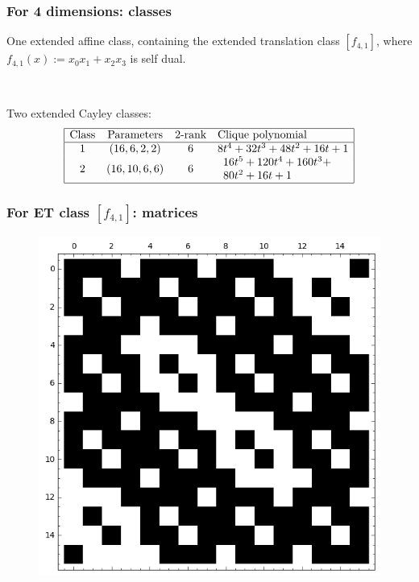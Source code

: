 \documentclass[pdf,sprung,slideColor,nocolorBG]{beamer}
\newenvironment{colortheme}[1]{
\def\ProvidesPackageRCS $##1${\relax}
\renewcommand{\ProcessOptions}{\relax}
\makeatletter

\makeatother
}{}
\begin{document}
\begin{colortheme}{jubata}
\begin{frame}
\begin{figure}
\begin{minipage}{.48\textwidth}
  \label{fig:c2_1_bent_cayley_graph_index_matrix}
\end{minipage}
\end{figure}
\end{frame}
\begin{frame}
\frametitle{For 4 dimensions: classes}

One extended affine class, containing the extended translation class $[f_{4,1}]$, where
$f_{4,1}(x) := x_0 x_1 + x_2 x_3$ is self dual.

~

Two extended Cayley classes:
\begin{align*}
\begin{array}{|cccl|}
\hline
\text{Class} &
\text{Parameters} &
\text{2-rank} &
\text{Clique polynomial}
\\
\hline
1 &
(16, 6, 2, 2) &
6 &
8t^{4} + 32t^{3} + 48t^{2} + 16t + 1
\\
2 &
(16, 10, 6, 6) &
6 &
\begin{array}{l}
16t^{5} + 120t^{4} + 160t^{3} +
\\
80t^{2} + 16t + 1
\end{array}
\\
\hline
\end{array}
\end{align*}
\end{frame}
\begin{frame}
\frametitle{For ET class $[f_{4,1}]$: matrices}
\begin{figure}
\centering
\begin{minipage}{.48\textwidth}
  \centering
  \includegraphics[width=.9\linewidth]{../matrix_plot/c4_1_weight_class_matrix.png}

\end{minipage}
\end{figure}
\end{frame}
\end{colortheme}
\end{document}
